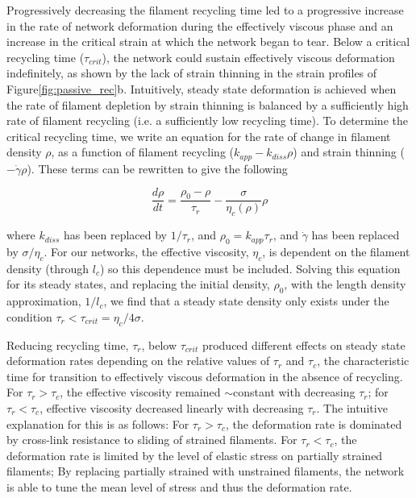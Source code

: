 \documentclass[10pt,letterpaper]{article}
\begin{document}
Progressively decreasing the filament recycling time led to a progressive increase in the rate of network deformation during the effectively viscous phase and an increase in the critical strain at which the network began to tear. Below a critical recycling time ($\tau_{crit}$), the network could sustain effectively viscous deformation indefinitely, as shown by the lack of strain thinning in the strain profiles of Figure\ref{fig:passive_rec}b. Intuitively, steady state deformation is achieved when the rate of filament depletion by strain thinning is balanced by a sufficiently high rate of filament recycling (i.e. a sufficiently low recycling time).  To determine the critical recycling time, we write an equation for the rate of change in filament density $\rho$, as a function of filament recycling ($k_{app}-k_{diss}\rho$) and strain thinning ($-\dot{\gamma}\rho$).
These terms can be rewritten to give the following 

\begin{equation}
\frac{d \rho}{dt} = \frac{\rho_0-\rho}{\tau_r}  - \frac{\sigma}{\eta_c(\rho)} \rho
\end{equation}

where $k_{diss}$  has been replaced by $1/\tau_r$, and $\rho_0 = k_{app}\tau_r$, and $\dot{\gamma}$ has been replaced by $\sigma/\eta_c$.  For our networks, the effective viscosity, $\eta_c$, is dependent on the filament density (through $l_c$) so this dependence must be included. Solving this equation for its steady states, and replacing the initial density, $\rho_0$, with the length density approximation, $1/l_c$, we find that a steady state density only exists under the condition $\tau_r < \tau_{crit}=\eta_c/4\sigma$.  

Reducing recycling time, $\tau_r$, below $\tau_{crit}$ produced different effects on steady state deformation rates depending on the relative values of $\tau_r$ and $\tau_c$, the characteristic time for transition to effectively viscous deformation in the absence of recycling. For $\tau_r > \tau_c$, the effective viscosity remained $\sim$constant with decreasing $\tau_r$; for $\tau_r < \tau_c$, effective viscosity decreased linearly with decreasing $\tau_r$.  The intuitive explanation for this is as follows: For $\tau_r > \tau_c$, the deformation rate is dominated by cross-link resistance to sliding of strained filaments. For $\tau_r < \tau_c$, the deformation rate is limited by the level of elastic stress on partially strained filaments; By replacing partially strained with unstrained filaments, the network is able to tune the mean level of stress and thus the deformation rate.
\end{document}
